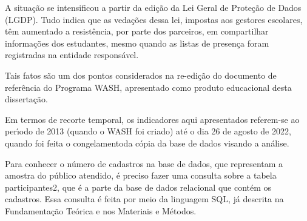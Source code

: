 \documentclass[
12pt,		%
openright,	%
twoside,  %
a4paper,			%
chapter=TITLE,		%
english,			%
french,				%
spanish,			%
brazil				%
]{USPSC-classe/USPSC}
\begin{document}
A situa\c{c}\~ao se intensificou a partir da edi\c{c}\~ao da Lei Geral de Prote\c{c}\~ao de Dados (LGDP). Tudo indica que as veda\c{c}\~oes dessa lei, impostas aos gestores escolares, t\^em aumentado a resist\^encia, por parte dos parceiros, em compartilhar informa\c{c}\~oes dos estudantes, mesmo quando as listas de presen\c{c}a foram registradas na entidade respons\'avel.

















Tais fatos s\~ao um dos pontos considerados na re-edi\c{c}\~ao do documento de refer\^encia do Programa WASH, apresentado como produto educacional desta disserta\c{c}\~ao.

















Em termos de recorte temporal, os indicadores aqui apresentados referem-se ao per\'{\i}odo de 2013 (quando o WASH foi criado) at\'e o dia 26 de agosto de 2022, quando foi feita o \textquotedbl congelamento\textquotedbl  da c\'opia da base de dados visando a an\'alise.

















Para conhecer o n\'umero de cadastros na base de dados, que representam a amostra do p\'ublico atendido, \'e preciso fazer uma consulta sobre a tabela \textquotedbl participantes2\textquotedbl , que \'e a parte da base de dados relacional que cont\'em os cadastros. Essa consulta \'e feita por meio da linguagem SQL, j\'a descrita na Fundamenta\c{c}\~ao Te\'orica e nos Materiais e M\'etodos.
\end{document}
